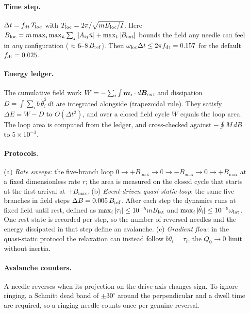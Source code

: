 \documentclass[11pt,a4paper]{article}
\newcommand{\vect}[1]{\boldsymbol{#1}}
\begin{document}
\paragraph{Time step.} $\Delta t=f_{\rm dt}\,T_{\rm loc}$ with $T_{\rm loc}=2\pi/\sqrt{mB_{\rm loc}/I}$. Here $B_{\rm loc}=m\max_i\max_{\hat u}\sum_j|A_{ij}\hat u|+\max_t|B_{\rm ext}|$ bounds the field any needle can feel in \emph{any} configuration ($\approx6$--$8\,B_{\rm ref}$). Then $\omega_{\rm loc}\Delta t\le2\pi f_{\rm dt}=0.157$ for the default $f_{\rm dt}=0.025$.

\paragraph{Energy ledger.} The cumulative field work $W=-\sum_i\int\vect m_i\cdot d\vect B_{\rm ext}$ and dissipation $D=\int\sum_ib\,\dot\theta_i^2\,dt$ are integrated alongside (trapezoidal rule). They satisfy $\Delta E=W-D$ to $O(\Delta t^2)$, and over a closed field cycle $W$ equals the loop area. The loop area is computed from the ledger, and cross-checked against $-\oint M\,dB$ to $5\times10^{-3}$.

\paragraph{Protocols.} (a) \emph{Rate sweeps}: the five-branch loop $0\to+B_{\max}\to0\to-B_{\max}\to0\to+B_{\max}$ at a fixed dimensionless rate $r$; the area is measured on the closed cycle that starts at the first arrival at $+B_{\max}$.
(b) \emph{Event-driven quasi-static loop}: the same five branches in field steps $\Delta B=0.005\,B_{\rm ref}$. After each step the dynamics runs at fixed field until rest, defined as $\max_i|\tau_i|\le10^{-5}mB_{\rm lat}$ and $\max_i|\dot\theta_i|\le10^{-5}\omega_{\rm lat}$. One rest state is recorded per step, so the number of reversed needles and the energy dissipated in that step define an avalanche.
(c) \emph{Gradient flow}: in the quasi-static protocol the relaxation can instead follow $b\dot\theta_i=\tau_i$, the $Q_0\to0$ limit without inertia.

\paragraph{Avalanche counters.} A needle reverses when its projection on the drive axis changes sign. To ignore ringing, a Schmitt dead band of $\pm30^\circ$ around the perpendicular and a dwell time are required, so a ringing needle counts once per genuine reversal.
\end{document}
